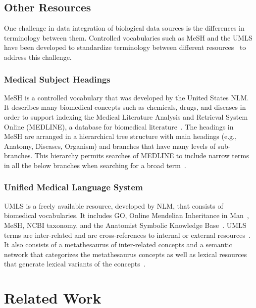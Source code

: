 \subsection{Other Resources}

One challenge in data integration of biological data sources is the differences in terminology between them.
Controlled vocabularies such as \ac{MeSH} and the \ac{UMLS} have been developed to standardize terminology between different resources~\cite{bodenreider_unified_2004} to address this challenge.

\subsubsection{Medical Subject Headings}

\ac{MeSH} is a controlled vocabulary that was developed by the United States \ac{NLM}.
It describes many biomedical concepts such as chemicals, drugs, and diseases in order to support indexing the Medical Literature Analysis and Retrieval System Online (MEDLINE), a database for biomedical literature~\cite{huang_recommending_2011}.
The headings in \ac{MeSH} are arranged in a hierarchical tree structure with main headings (e.g., Anatomy, Diseases, Organism) and branches that have many levels of sub-branches.
This hierarchy permits searches of MEDLINE to include narrow terms in all the below branches when searching for a broad term~\cite{noauthor_introduction_nodate}.

\subsubsection{Unified Medical Language System}

\ac{UMLS} is a freely available resource, developed by \ac{NLM}, that consists of biomedical vocabularies.
It includes \ac{GO}, Online Mendelian Inheritance in Man~\cite{amberger_omim.org:_2015}, \ac{MeSH}, \ac{NCBI} taxonomy, and the Anatomist Symbolic Knowledge Base~\cite{rosse_motivation_1998}.
\ac{UMLS} terms are inter-related and are cross-references to internal or external resources~\cite{bodenreider_unified_2004}.
It also consists of a metathesaurus of inter-related concepts and a semantic network that categorizes the metathesaurus concepts as well as lexical resources that generate lexical variants of the concepts~\cite{bodenreider_unified_2004}.

\section{Related Work}

